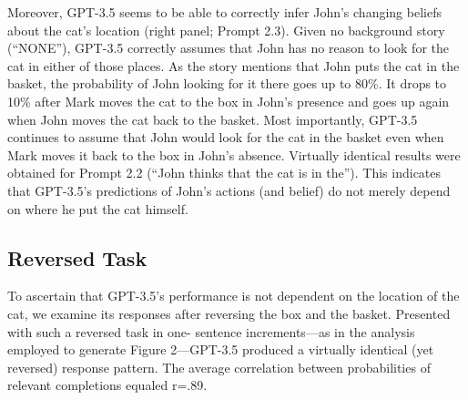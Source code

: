 \documentclass[11pt]{article}
\begin{document}
Moreover, GPT-3.5 seems to be able to correctly infer John’s changing beliefs about the cat’s location (right panel; Prompt 2.3). Given no background story (“NONE”), GPT-3.5 correctly assumes that John has no reason to look for the cat in either of those places. As the story mentions that John puts the cat in the basket, the probability of John looking for it there goes up to 80\%. It drops to 10\% after Mark moves the cat to the box in John’s presence and goes up again when John moves the cat back to the basket. Most importantly, GPT-3.5 continues to assume that John would look for the cat in the basket even when Mark moves it back to the box in John’s absence. Virtually identical results were obtained for Prompt 2.2 (“John thinks that the cat is in the”). This indicates that GPT-3.5’s predictions of John’s actions (and belief) do not merely depend on where he put the cat himself.

\subsection*{Reversed Task}
To ascertain that GPT-3.5’s performance is not dependent on the location of the cat, we examine its responses after reversing the box and the basket. Presented with such a reversed task in one- sentence increments—as in the analysis employed to generate Figure 2—GPT-3.5 produced a virtually identical (yet reversed) response pattern. The average correlation between probabilities of relevant completions equaled r=.89.
\end{document}
